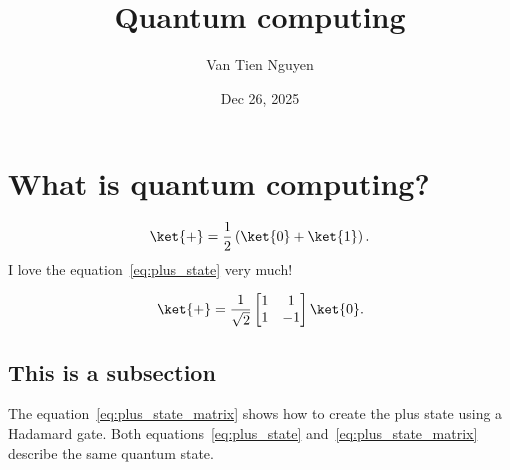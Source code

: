 \title{Quantum computing}
\author{Van Tien Nguyen}
\date{Dec 26, 2025}


\maketitle

\section{What is quantum computing?}
\begin{equation}
  \ket{+} = \frac{1}{2}\left(\ket{0}+\ket{1}\right).
  \label{eq:plus_state}
\end{equation}
I love the equation~\eqref{eq:plus_state} very much!

\begin{equation}
\ket{+} = \frac{1}{\sqrt{2}}\begin{bmatrix}
    1 & 1 \\
    1 & -1
\end{bmatrix}\ket{0}.
\label{eq:plus_state_matrix}
\end{equation}

\subsection{This is a subsection}

The equation~\eqref{eq:plus_state_matrix} shows how to create the plus state using a Hadamard gate. Both equations~\eqref{eq:plus_state} and~\eqref{eq:plus_state_matrix} describe the same quantum state.

